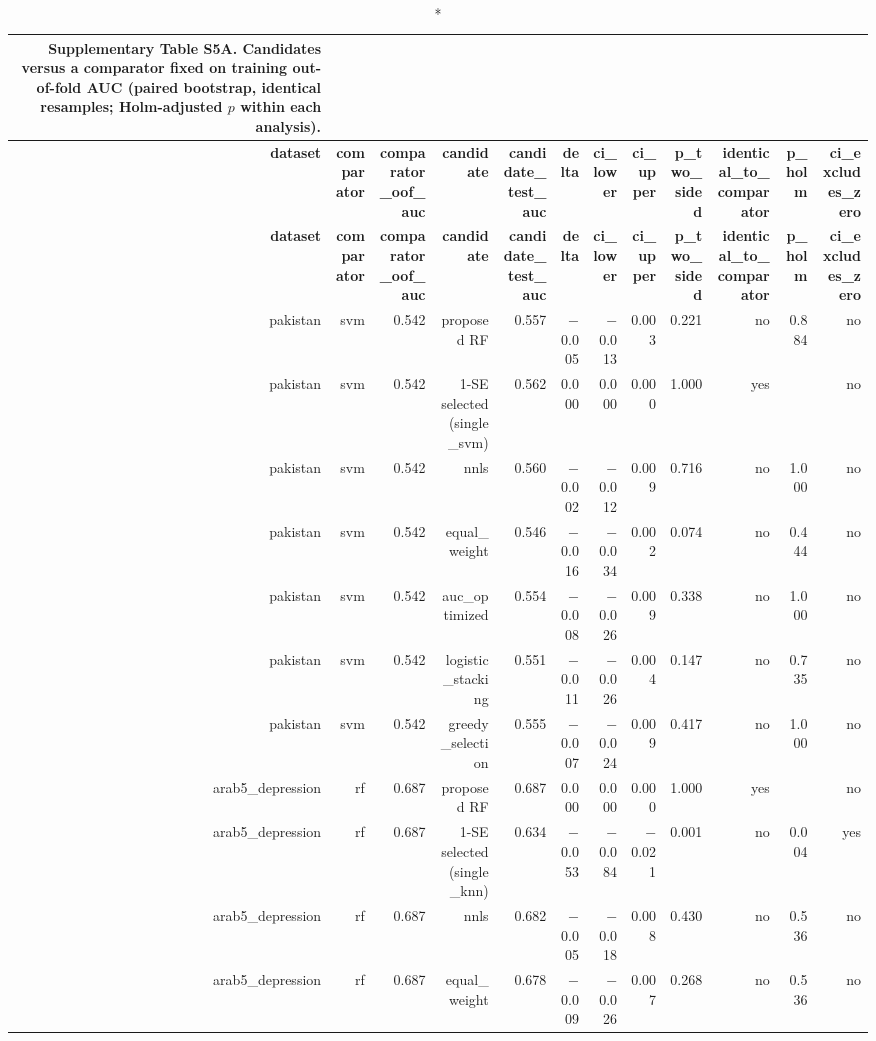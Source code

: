 \documentclass[10pt]{article}
\begin{document}
\tiny
\setlength{\tabcolsep}{2pt}
\begin{longtable}{rrrrrrrrrrrr}
\caption*{\textbf{Supplementary Table S5A.} Candidates versus a comparator fixed on training out-of-fold AUC (paired bootstrap, identical resamples; Holm-adjusted $p$ within each analysis).}\\
\toprule
\textbf{dataset} & \textbf{comparator} & \textbf{comparator\_oof\_auc} & \textbf{candidate} & \textbf{candidate\_test\_auc} & \textbf{delta} & \textbf{ci\_lower} & \textbf{ci\_upper} & \textbf{p\_two\_sided} & \textbf{identical\_to\_comparator} & \textbf{p\_holm} & \textbf{ci\_excludes\_zero} \\
\midrule
\endfirsthead
\toprule
\textbf{dataset} & \textbf{comparator} & \textbf{comparator\_oof\_auc} & \textbf{candidate} & \textbf{candidate\_test\_auc} & \textbf{delta} & \textbf{ci\_lower} & \textbf{ci\_upper} & \textbf{p\_two\_sided} & \textbf{identical\_to\_comparator} & \textbf{p\_holm} & \textbf{ci\_excludes\_zero} \\
\midrule
\endhead
\bottomrule
\endfoot
pakistan & svm & 0.542 & proposed RF & 0.557 & $-$0.005 & $-$0.013 & 0.003 & 0.221 & no & 0.884 & no \\
pakistan & svm & 0.542 & 1-SE selected (single\_svm) & 0.562 & 0.000 & 0.000 & 0.000 & 1.000 & yes &  & no \\
pakistan & svm & 0.542 & nnls & 0.560 & $-$0.002 & $-$0.012 & 0.009 & 0.716 & no & 1.000 & no \\
pakistan & svm & 0.542 & equal\_weight & 0.546 & $-$0.016 & $-$0.034 & 0.002 & 0.074 & no & 0.444 & no \\
pakistan & svm & 0.542 & auc\_optimized & 0.554 & $-$0.008 & $-$0.026 & 0.009 & 0.338 & no & 1.000 & no \\
pakistan & svm & 0.542 & logistic\_stacking & 0.551 & $-$0.011 & $-$0.026 & 0.004 & 0.147 & no & 0.735 & no \\
pakistan & svm & 0.542 & greedy\_selection & 0.555 & $-$0.007 & $-$0.024 & 0.009 & 0.417 & no & 1.000 & no \\
arab5\_depression & rf & 0.687 & proposed RF & 0.687 & 0.000 & 0.000 & 0.000 & 1.000 & yes &  & no \\
arab5\_depression & rf & 0.687 & 1-SE selected (single\_knn) & 0.634 & $-$0.053 & $-$0.084 & $-$0.021 & 0.001 & no & 0.004 & yes \\
arab5\_depression & rf & 0.687 & nnls & 0.682 & $-$0.005 & $-$0.018 & 0.008 & 0.430 & no & 0.536 & no \\
arab5\_depression & rf & 0.687 & equal\_weight & 0.678 & $-$0.009 & $-$0.026 & 0.007 & 0.268 & no & 0.536 & no \\

\end{longtable}
\end{document}
